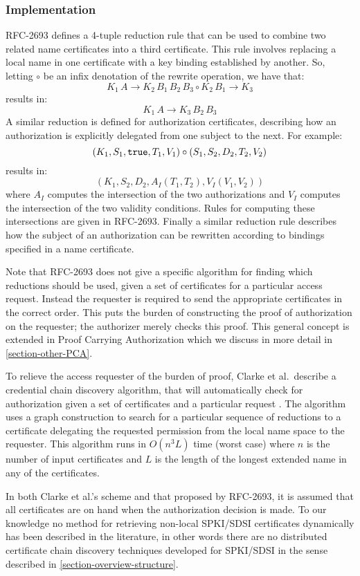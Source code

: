 \subsubsection{Implementation}
\label{section-SDSI-SPKI-implementation}

RFC-2693 \cite{RFC-2693} defines a 4-tuple reduction rule that can be
used to combine two related name certificates into a third
certificate.  This rule involves replacing a local name in one
certificate with a key binding established by another.
So, letting $\circ$ be an infix denotation of the rewrite
operation, we have that:
$$
K_1\,A \rightarrow K_2\,B_1\,B_2\,B_3 \circ K_2\,B_1 \rightarrow K_3
$$
results in:
$$
K_1\,A \rightarrow K_3\,B_2\,B_3
$$
A similar reduction is defined for authorization certificates,
describing how an authorization is explicitly delegated from one
subject to the next. For example:
$$
(K_1, S_1, \text{\tt true}, T_1, V_1) \circ (S_1, S_2, D_2, T_2, V_2)
$$
results in:
$$
(K_1, S_2, D_2, A_I(T_1, T_2), V_I(V_1, V_2))
$$
where $A_I$ computes the intersection of the two authorizations and
$V_I$ computes the intersection of the two validity conditions. Rules
for computing these intersections are given in RFC-2693.  Finally a
similar reduction rule describes how the subject of an authorization
can be rewritten according to bindings specified in a name
certificate. 

Note that RFC-2693 does not give a specific algorithm for finding
which reductions should be used, given a set of certificates for a
particular access request. Instead the requester is required to send
the appropriate certificates in the correct order. This puts the
burden of constructing the proof of authorization on the requester;
the authorizer merely checks this proof. This general concept is
extended in Proof Carrying Authorization which we discuss in more
detail in \autoref{section-other-PCA}.

To relieve the access requester of the burden of proof, Clarke et
al.~describe a credential chain discovery algorithm, that will
automatically check for authorization given a set of certificates and
a particular request \cite{Clarke:CCDSS}. The algorithm uses a graph
construction to search for a particular sequence of reductions to
a certificate delegating the requested permission from the local
name space to the requester. This algorithm runs in $O(n^3
L)$ time (worst case) where $n$ is the number of input certificates
and $L$ is the length of the longest extended name in any of the
certificates.

In both Clarke et al.'s scheme and that proposed by RFC-2693, it is
assumed that all certificates are on hand when the authorization
decision is made.  To our knowledge no method for retrieving
non-local SPKI/SDSI certificates dynamically has been described in the
literature, in other words there are no distributed certificate chain
discovery techniques developed for SPKI/SDSI in the sense 
described in \autoref{section-overview-structure}.

